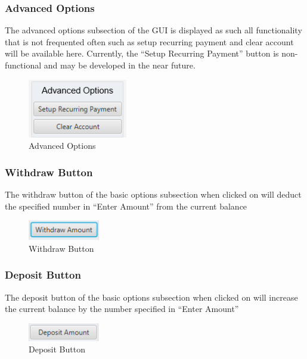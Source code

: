 \documentclass[12pt]{article}
\begin{document}
\subsubsection{Advanced Options}

The advanced options subsection of the GUI is displayed as such all functionality that is not frequented often such as setup recurring payment and clear account will be available here. Currently, the “Setup Recurring Payment” button is non-functional and may be developed in the near future. 

\begin{figure}[h!]
  \centering
  \includegraphics[]{advanced_options.png}
  \caption{Advanced Options}
\end{figure}

\subsubsection{Withdraw Button}
The withdraw button of the basic options subsection when clicked on will deduct the specified number in “Enter Amount” from the current balance

\begin{figure}[h!]
  \centering
  \includegraphics[]{withdraw_button.png}
  \caption{Withdraw Button}
\end{figure}

\subsubsection{Deposit Button}

The deposit button of the basic options subsection when clicked on will increase the current balance by the number specified in “Enter Amount”

\begin{figure}[h!]
  \centering
  \includegraphics[]{deposit_button.png}
  \caption{Deposit Button}
\end{figure}
\end{document}
